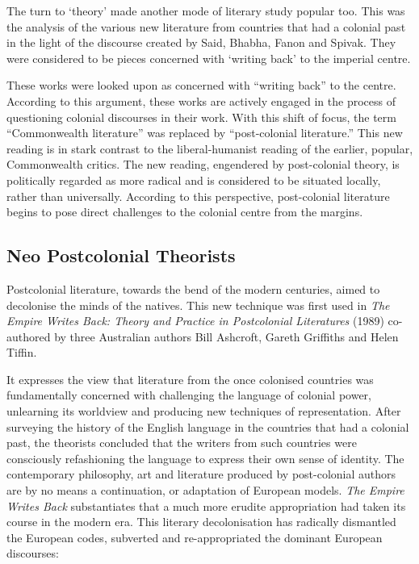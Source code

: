 \begin{description}
 The turn to ‘theory’ made another mode of literary study popular too. This was the analysis of the various new literature from countries that had a colonial past in the light of the discourse created by Said, Bhabha, Fanon and Spivak. They were considered to be pieces concerned with ‘writing back’ to the imperial centre. 
 
 These works were looked upon as concerned with “writing back” to the centre. According to this argument, these works are actively engaged in the process of questioning colonial discourses in their work. With this shift of focus, the term “Commonwealth literature” was replaced by “post-colonial literature.” This new reading is in stark contrast to the liberal-humanist reading of the earlier, popular, Commonwealth critics. The new reading, engendered by post-colonial theory, is politically regarded as more radical and is considered to be situated locally, rather than universally. According to this perspective, post-colonial literature begins to pose direct challenges to the colonial centre from the margins.
\end{description}

\subsection{Neo Postcolonial Theorists}

Postcolonial literature, towards the bend of the modern centuries, aimed to decolonise the minds of the natives. This new technique was first used in \emph{The Empire Writes Back: Theory and Practice in Postcolonial Literatures} (1989) co-authored by three Australian authors Bill Ashcroft, Gareth Griffiths and Helen Tiffin. 

It expresses the view that literature from the once colonised countries was fundamentally concerned with challenging the language of colonial power, unlearning its worldview and producing new techniques of representation. After surveying the history of the English language in the countries that had a colonial past, the theorists concluded that the writers from such countries were consciously refashioning the language to express their own sense of identity. The contemporary philosophy, art and literature produced by post-colonial authors are by no means a continuation, or adaptation of European models. \emph{The Empire Writes Back} substantiates that a much more erudite appropriation had taken its course in the modern era. This literary decolonisation has radically dismantled the European codes, subverted and re-appropriated the dominant European discourses: 

